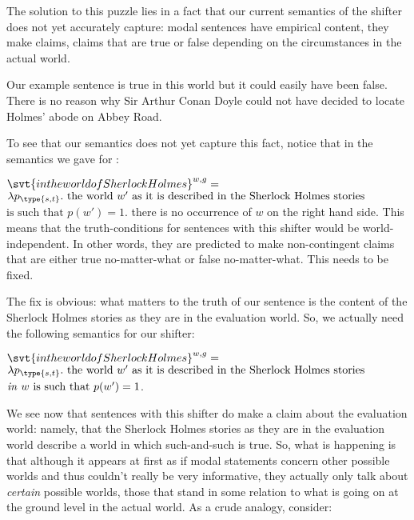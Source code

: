 The solution to this puzzle lies in a fact that our current semantics of the
shifter  does not yet accurately
capture: modal sentences have empirical content, they make 
claims, claims that are true or false depending on the circumstances in the
actual world.

Our example sentence  is true in this world but it could
easily have been false. There is no reason why Sir Arthur Conan Doyle could not
have decided to locate Holmes' abode on Abbey Road.

To see that our semantics does not yet capture this fact, notice that in the
semantics we gave for :

\ex $\svt{in the world of Sherlock Holmes}^{w,g} =$\\
$\lambda p_{\type{s,t}}.\ \mbox{the world } w' \mbox{ as it is described in the
  Sherlock Holmes stories}$\\
$\mbox{is such that } p(w') = 1$.
\xe
%
there is no occurrence of $w$ on the right hand side. This means that the
truth-conditions for sentences with this shifter would be world-independent. In
other words, they are predicted to make non-contingent claims that are either
true no-matter-what or false no-matter-what. This needs to be fixed.

The fix is obvious: what matters to the truth of our sentence is the content of
the Sherlock Holmes stories as they are in the evaluation world. So, we actually
need the following semantics for our shifter:

\ex $\svt{in the world of Sherlock Holmes}^{w,g} =$\\
$\lambda p_{\type{s,t}}.\ \mbox{the world } w' \mbox{ as it is described in the
  Sherlock Holmes stories}$\\
$\mbox{\emph{in} } w \mbox{ is such that } p(w') = 1$. \xe

We see now that sentences with this shifter do make a claim about the evaluation
world: namely, that the Sherlock Holmes stories as they are in the evaluation
world describe a world in which such-and-such is true. So, what is happening is
that although it appears at first as if modal statements concern other possible
worlds and thus couldn't really be very informative, they actually only talk
about \emph{certain} possible worlds, those that stand in some relation to what
is going on at the ground level in the actual world. As a crude analogy,
consider:

